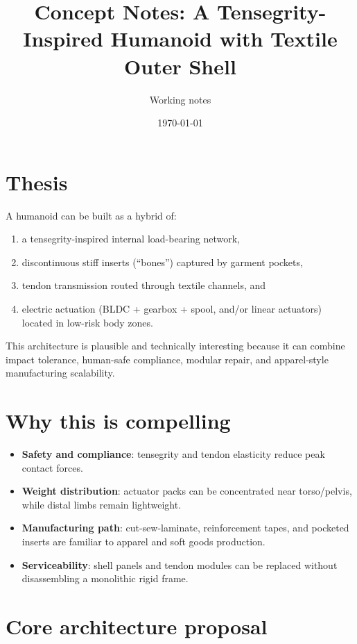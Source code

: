 \documentclass[11pt]{article}
\title{Concept Notes: A Tensegrity-Inspired Humanoid with Textile Outer Shell}
\author{Working notes}
\date{\today}
\begin{document}
\maketitle

\section*{Thesis}
A humanoid can be built as a hybrid of:
\begin{enumerate}[leftmargin=*]
  \item a tensegrity-inspired internal load-bearing network,
  \item discontinuous stiff inserts (``bones'') captured by garment pockets,
  \item tendon transmission routed through textile channels, and
  \item electric actuation (BLDC + gearbox + spool, and/or linear actuators) located in low-risk body zones.
\end{enumerate}

This architecture is plausible and technically interesting because it can combine impact tolerance, human-safe compliance, modular repair, and apparel-style manufacturing scalability.

\section*{Why this is compelling}
\begin{itemize}[leftmargin=*]
  \item \textbf{Safety and compliance}: tensegrity and tendon elasticity reduce peak contact forces.
  \item \textbf{Weight distribution}: actuator packs can be concentrated near torso/pelvis, while distal limbs remain lightweight.
  \item \textbf{Manufacturing path}: cut-sew-laminate, reinforcement tapes, and pocketed inserts are familiar to apparel and soft goods production.
  \item \textbf{Serviceability}: shell panels and tendon modules can be replaced without disassembling a monolithic rigid frame.
\end{itemize}

\section*{Core architecture proposal}
\end{document}

